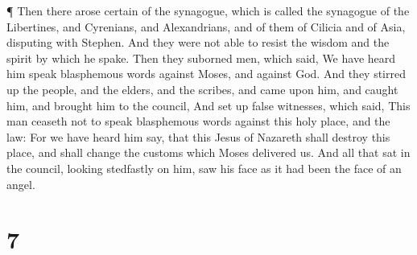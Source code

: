  ¶ Then there arose certain of the synagogue, which is
called the synagogue of the Libertines, and Cyrenians, and Alexandrians,
and of them of Cilicia and of Asia, disputing with Stephen.
 And they were not able to resist the wisdom and the spirit
by which he spake.  Then they suborned men, which said, We
have heard him speak blasphemous words against Moses, and against God.
 And they stirred up the people, and the elders, and the
scribes, and came upon him, and caught him, and brought him to the
council,  And set up false witnesses, which said, This man
ceaseth not to speak blasphemous words against this holy place, and the
law:  For we have heard him say, that this Jesus of
Nazareth shall destroy this place, and shall change the customs which
Moses delivered us.  And all that sat in the council,
looking stedfastly on him, saw his face as it had been the face of an
angel.

\hypertarget{section-6}{%
\section{7}\label{section-6}}

